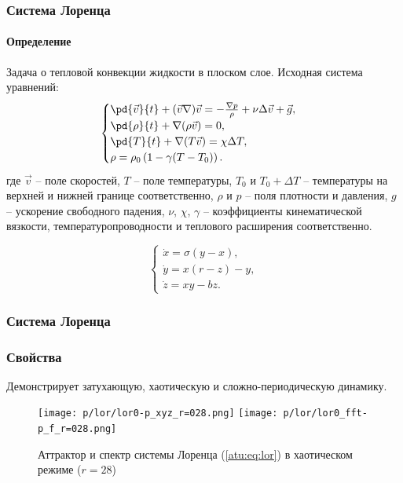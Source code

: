 \documentclass[10pt,utf8]{beamer}
\begin{document}
\begin{frame}
  \frametitle{Система Лоренца}
  \framesubtitle{Определение}

Задача о тепловой конвекции жидкости в плоском слое. Исходная система уравнений:
%
  \begin{equation}
  \begin{cases}
    \pd{\vec{v}}{t} + ( \vec{v} \nabla ) \vec{v} = - \frac{\nabla p}{\rho} + \nu \Delta \vec{v} + \vec{g}, \\
    \pd{\rho}{t} + \nabla ( \rho \vec{v} ) = 0 , \\
    \pd{T}{t} +\nabla ( T \vec{v} ) = \chi \Delta T , \\
    \rho = \rho_0 \left( 1 - \gamma (T - T_0) \right) .
  \end{cases}
  \label{atu:eq:lor_gidro}
  \end{equation}
  где
  $\vec{v} $   -- поле скоростей,
  $T$ -- поле температуры,
  $T_0$ и $T_0+\Delta T$   -- температуры на верхней и нижней границе соответственно,
  $\rho$ и $p$ -- поля плотности и давления,
  $g$ -- ускорение свободного падения,
  $\nu$, $\chi$, $\gamma$  -- коэффициенты кинематической вязкости, температуропроводности и
  теплового расширения соответственно.

%
  \begin{equation}
  \begin{cases}
    \dot{x} = \sigma (y-x ) , \\
    \dot{y} = x (r-z) - y , \\
    \dot{z} = x y - b z .
  \end{cases}
  \label{atu:eq:lor}
  \end{equation}

\end{frame}




\begin{frame}
  \frametitle{Система Лоренца}
  \frametitle{Свойства}

  Демонстрирует затухающую, хаотическую и сложно-периодическую динамику.

  \begin{figure}[h!]
  \begin{center}
    \texttt{[image: p/lor/lor0-p\_xyz\_r=028.png]}
    \hfill
    \texttt{[image: p/lor/lor0\_fft-p\_f\_r=028.png]}
  \end{center}
    \caption{Аттрактор и спектр системы Лоренца (\ref{atu:eq:lor}) в хаотическом режиме ($r=28$)}
  \label{atu:f:lor_attractor_phase_chaos28}
  \end{figure}

\end{frame}
\end{document}
